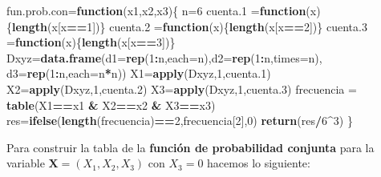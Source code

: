 \documentclass[]{book}
\newenvironment{Shaded}{\begin{snugshade}}{\end{snugshade}}
\newcommand{\ControlFlowTok}[1]{\textcolor[rgb]{0.13,0.29,0.53}{\textbf{#1}}}
\newcommand{\DataTypeTok}[1]{\textcolor[rgb]{0.13,0.29,0.53}{#1}}
\newcommand{\DecValTok}[1]{\textcolor[rgb]{0.00,0.00,0.81}{#1}}
\newcommand{\FloatTok}[1]{\textcolor[rgb]{0.00,0.00,0.81}{#1}}
\newcommand{\KeywordTok}[1]{\textcolor[rgb]{0.13,0.29,0.53}{\textbf{#1}}}
\newcommand{\NormalTok}[1]{#1}
\newcommand{\OperatorTok}[1]{\textcolor[rgb]{0.81,0.36,0.00}{\textbf{#1}}}
\newcommand{\StringTok}[1]{\textcolor[rgb]{0.31,0.60,0.02}{#1}}
\begin{document}
\begin{Shaded}
\begin{Highlighting}[]
\NormalTok{fun.prob.con=}\ControlFlowTok{function}\NormalTok{(x1,x2,x3)\{}
\NormalTok{  n=}\DecValTok{6}
\NormalTok{  cuenta}\FloatTok{.1}\NormalTok{ =}\ControlFlowTok{function}\NormalTok{(x)\{}\KeywordTok{length}\NormalTok{(x[x}\OperatorTok{==}\DecValTok{1}\NormalTok{])\}}
\NormalTok{  cuenta}\FloatTok{.2}\NormalTok{ =}\ControlFlowTok{function}\NormalTok{(x)\{}\KeywordTok{length}\NormalTok{(x[x}\OperatorTok{==}\DecValTok{2}\NormalTok{])\}}
\NormalTok{  cuenta}\FloatTok{.3}\NormalTok{ =}\ControlFlowTok{function}\NormalTok{(x)\{}\KeywordTok{length}\NormalTok{(x[x}\OperatorTok{==}\DecValTok{3}\NormalTok{])\}}
\NormalTok{  Dxyz=}\KeywordTok{data.frame}\NormalTok{(}\DataTypeTok{d1=}\KeywordTok{rep}\NormalTok{(}\DecValTok{1}\OperatorTok{:}\NormalTok{n,}\DataTypeTok{each=}\NormalTok{n),}\DataTypeTok{d2=}\KeywordTok{rep}\NormalTok{(}\DecValTok{1}\OperatorTok{:}\NormalTok{n,}\DataTypeTok{times=}\NormalTok{n),}
                  \DataTypeTok{d3=}\KeywordTok{rep}\NormalTok{(}\DecValTok{1}\OperatorTok{:}\NormalTok{n,}\DataTypeTok{each=}\NormalTok{n}\OperatorTok{*}\NormalTok{n))}
\NormalTok{  X1=}\KeywordTok{apply}\NormalTok{(Dxyz,}\DecValTok{1}\NormalTok{,cuenta}\FloatTok{.1}\NormalTok{)}
\NormalTok{  X2=}\KeywordTok{apply}\NormalTok{(Dxyz,}\DecValTok{1}\NormalTok{,cuenta}\FloatTok{.2}\NormalTok{)}
\NormalTok{  X3=}\KeywordTok{apply}\NormalTok{(Dxyz,}\DecValTok{1}\NormalTok{,cuenta}\FloatTok{.3}\NormalTok{)}
\NormalTok{  frecuencia =}\StringTok{ }\KeywordTok{table}\NormalTok{(X1}\OperatorTok{==}\NormalTok{x1 }\OperatorTok{&}\StringTok{ }\NormalTok{X2}\OperatorTok{==}\NormalTok{x2 }\OperatorTok{&}\StringTok{ }\NormalTok{X3}\OperatorTok{==}\NormalTok{x3)}
\NormalTok{  res=}\KeywordTok{ifelse}\NormalTok{(}\KeywordTok{length}\NormalTok{(frecuencia)}\OperatorTok{==}\DecValTok{2}\NormalTok{,frecuencia[}\DecValTok{2}\NormalTok{],}\DecValTok{0}\NormalTok{)}
  \KeywordTok{return}\NormalTok{(res}\OperatorTok{/}\DecValTok{6}\OperatorTok{^}\DecValTok{3}\NormalTok{)}
\NormalTok{\}}
\end{Highlighting}
\end{Shaded}

Para construir la tabla de la \textbf{función de probabilidad conjunta} para la variable \(\mathbf{X}=(X_1,X_2,X_3)\) con \(X_3=0\) hacemos lo siguiente:
\end{document}
